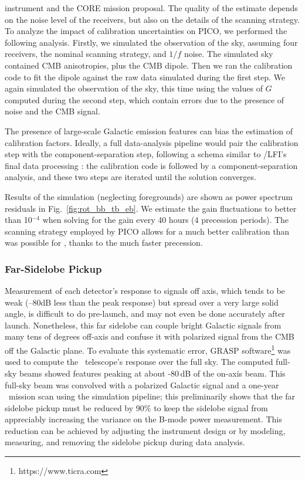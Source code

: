 \documentclass[PICOReport.tex]{subfiles}
\begin{document}
instrument and the CORE mission proposal. The quality of the estimate depends on the noise level of the receivers, but also on the details of the scanning strategy. 
To analyze the impact of calibration uncertainties on PICO, we performed  the following analysis. Firstly, we simulated the observation of the sky, assuming four receivers, the nominal scanning strategy, and $1/f$ noise. The simulated sky contained CMB anisotropies, plus the CMB dipole. Then we ran the calibration code to fit the dipole against the raw data simulated during the first step. We again simulated the observation of the sky, this time using the values of $G$ computed during the second step, which contain errors due to the presence of noise and the CMB signal.

The presence of large-scale Galactic emission features can bias the estimation of calibration factors. Ideally, a full data-analysis pipeline would pair the calibration step with the component-separation step, following a schema similar to \planck/LFI's final data processing \cite{Planck2018_II}: the calibration code is followed by a component-separation analysis, and these two steps are iterated until the solution converges.

Results of the simulation (neglecting foregrounds) are shown as power spectrum residuals in Fig.~\ref{fig:rot_bb_tb_eb}. 
We estimate the gain fluctuations to better than 10$^{-4}$ when solving for the gain every 40 hours (4 precession periods).
The scanning strategy employed by PICO allows for a much better calibration than was possible for \planck, thanks to the much faster precession.

\subsubsection{Far-Sidelobe Pickup}
\label{sec:fsl}
Measurement of each detector's response to signals off axis, which tends to be weak (--80dB less than the peak response) but spread over a very large solid angle, is difficult to do pre-launch, and may not even be done accurately after launch.  Nonetheless, this far sidelobe can couple bright Galactic signals from many tens of degrees off-axis and confuse it with polarized signal from the CMB off the Galactic plane.    To evaluate this systematic error, GRASP software\footnote{https://www.ticra.com} was used to compute the \pico\ telescope's response over the full sky.  The computed full-sky beams showed features peaking at about -80\,dB of the on-axis beam.   
This full-sky beam was convolved with a polarized Galactic signal and a one-year \pico\ mission scan using the simulation pipeline; this preliminarily shows that the far sidelobe pickup must be reduced by 90\%  to keep the sidelobe signal from appreciably increasing the variance on the B-mode power measurement.
This reduction can be achieved by adjusting the instrument design or by modeling, measuring, and removing the sidelobe pickup during data analysis.
\end{document}
